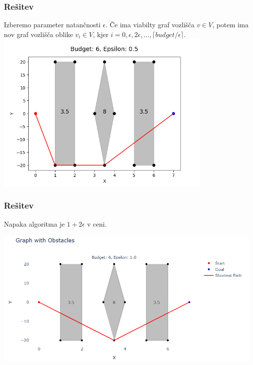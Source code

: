 \documentclass{beamer}
\begin{document}
\begin{frame}
    \frametitle{Rešitev}
    Izberemo parameter natančnosti $\epsilon$.
    Če ima viabilty graf vozlišča $v \in V$, potem ima nov graf vozlišča oblike $v_i \in V$, kjer $i = 0, \epsilon, 2\epsilon, \dots, \lceil budget/\epsilon\rceil$.
    \pause
    \includegraphics[width=0.8\textwidth]{errPath1.png}

\end{frame}

\begin{frame}
    \frametitle{Rešitev}
    Napaka algoritma je $1+2\epsilon$ v ceni.

    \includegraphics[width=1\textwidth]{errorProblem1.png}

\end{frame}
\end{document}
